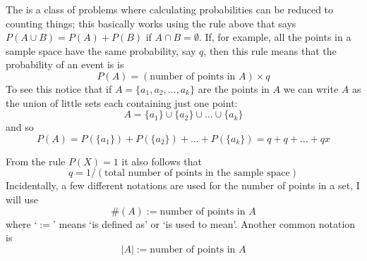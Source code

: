\documentclass[11pt,a4paper]{scrartcl}
\begin{document}
The is a class of problems where calculating probabilities can be
reduced to counting things; this basically works using the rule above
that says $P(A\cup B)=P(A)+P(B)$ if $A\cap B=\emptyset$. If, for
example, all the points in a sample space have the same probability, say $q$, then
this rule means that the probability of an event is is 
\begin{equation}
P(A)=(\mbox{number of points in }A)\times q
\end{equation}
To see this notice that if $A=\{a_1,a_2,\ldots,a_k\}$ are the points in $A$ we can write $A$ as the union of little sets each containing just one point:
\begin{equation}
A=\{a_1\}\cup\{a_2\}\cup\ldots\cup\{a_k\}
\end{equation}
and so
\begin{equation}
P(A)=P(\{a_1\})+P(\{a_2\})+\ldots+P(\{a_k\})=q+q+\ldots+qx
\end{equation}

From the rule $P(X)=1$ it also follows that 
\begin{equation}
q=1/(\mbox{total number of points in the sample space})
\end{equation}
Incidentally, a few different notations are used for the number of points in a set, I will use
\begin{equation}
\#(A):=\mbox{number of points in }A
\end{equation}
where \lq{}$:=$\rq{} means \lq{}is defined as\rq{} or \lq{}is used to
mean\rq{}. Another common notation is
\begin{equation}
|A|:=\mbox{number of points in }A
\end{equation}
\end{document}
